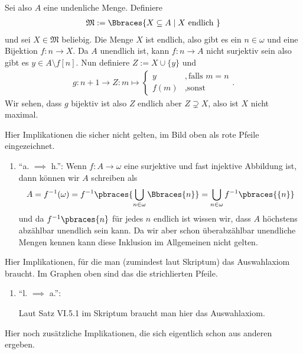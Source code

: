 \begin{solution}
\begin{enumerate}[label = \texttt{ad}]
	Sei also $A$ eine undenliche Menge. Definiere
	\begin{align*}
	\mathfrak{M}:=\Bbraces{X \subseteq A \mid X \text{ endlich }}
	\end{align*}
	und sei $X \in \mathfrak{M}$ beliebig. Die Menge $X$ ist endlich, also gibt es ein $n \in \omega$ und eine Bijektion $f:n \to X$. Da $A$ unendlich ist, kann $f:n \to A$ nicht surjektiv sein also gibt es $y \in A \setminus f[n]$. Nun definiere $Z := X \cup \{y\}$ und
	\begin{align*}
	g:n + 1 \to Z: m \mapsto
	\begin{cases}
	y & ,\text{falls } m = n \\
	f(m) & ,\text{sonst }
	\end{cases}.
	\end{align*}
	Wir sehen, dass $g$ bijektiv ist also $Z$ endlich aber $Z \supsetneq X$, also ist $X$ nicht maximal.
\end{enumerate}




Hier Implikationen die sicher nicht gelten, im Bild oben als rote Pfeile eingezeichnet.

\begin{enumerate}[label = \texttt{ad}]
	\item \enquote{a. $\implies$ h.}: Wenn $f: A \to \omega$ eine surjektive und fast injektive Abbildung ist, dann können wir $A$ schreiben als
	\begin{align*}
		A = f^{-1}(\omega) = f^{-1}\pbraces{\bigcup_{n \in \omega} \Bbraces{n}} = \bigcup_{n \in \omega} f^{-1}\pbraces{\{n\}}
	\end{align*}
	und da $f^{-1}\pbraces{{n}}$ für jedes $n$ endlich ist wissen wir, dass $A$ höchstens abzählbar unendlich sein kann. Da wir aber schon überabzählbar unendliche Mengen kennen kann diese Inklusion im Allgemeinen nicht gelten. 
\end{enumerate}


Hier Implikationen, für die man (zumindest laut Skriptum) das Auswahlaxiom braucht. Im Graphen oben sind das die strichlierten Pfeile.
\begin{enumerate}[label = \texttt{ad}]
	\item \enquote{l. $\implies$ a.}:
	
	Laut Satz VI.5.1 im Skriptum braucht man hier das Auswahlaxiom.
\end{enumerate}


Hier noch zusätzliche Implikationen, die sich eigentlich schon aus anderen ergeben.



\end{solution}
